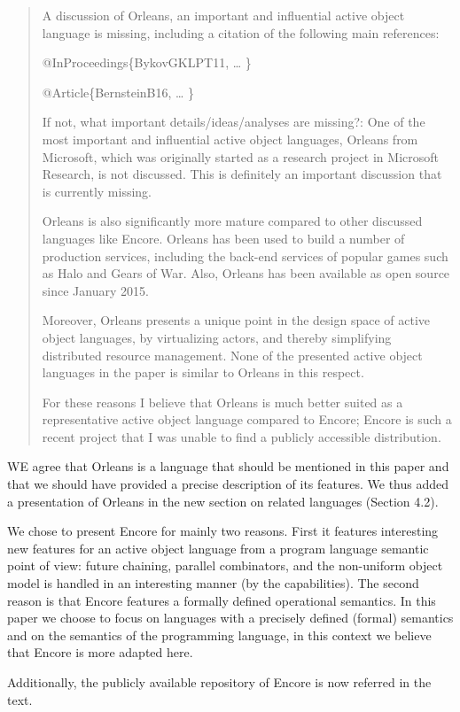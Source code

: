 \documentclass{article}
\begin{document}
\begin{quote}
	 A discussion of Orleans, an important and 
influential active object language is missing, including a citation of the following main 
references:

@InProceedings\{BykovGKLPT11,
\ldots
\}

@Article\{BernsteinB16,
\ldots
\}


If not, what important details/ideas/analyses are missing?: One of the most important and 
influential active object languages, Orleans from Microsoft, which was originally started 
as a research project in Microsoft Research, is not discussed. This is definitely an 
important discussion that is currently missing.

Orleans is also significantly more mature compared to other discussed languages like 
Encore. Orleans has been used to build a number of production services, including the 
back-end services of popular games such as Halo and Gears of War. Also, Orleans has been 
available as open source since January 2015.

Moreover, Orleans presents a unique point in the design space of active object languages, 
by virtualizing actors, and thereby simplifying distributed resource management. None of 
the presented active object languages in the paper is similar to Orleans in this respect.

For these reasons I believe that Orleans is much better suited as a representative active 
object language compared to Encore; Encore is such a recent project that I was unable to 
find a publicly accessible distribution.

\end{quote}
WE agree that Orleans is a language that should be mentioned in this paper and that we 
should have provided a precise description of its features.
We thus added a presentation of Orleans in the new section on related languages 
(Section 4.2).

We chose to present Encore for mainly two reasons. First it 
features interesting new features for an active object language from a program language 
semantic point of view: future chaining, parallel combinators, and the 
non-uniform object model is handled in an interesting manner (by the capabilities). The 
second reason is that 
Encore features a formally defined operational semantics. 
In this paper we choose to focus on languages with a precisely defined (formal) semantics 
and on the  semantics of the programming language, in this context we believe 
that Encore is more adapted here. 


Additionally,  the publicly available repository of Encore is now referred in the 
text.
\end{document}

